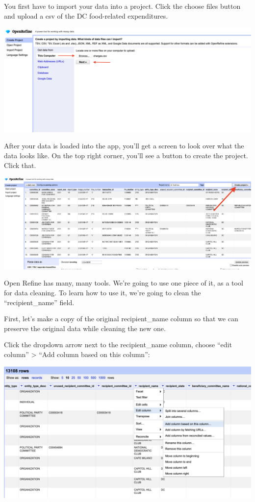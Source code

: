 \documentclass[
  letterpaper,
  DIV=11,
  numbers=noendperiod]{scrreprt}
\begin{document}
You first have to import your data into a project. Click the choose
files button and upload a csv of the DC food-related expenditures.

\includegraphics{./images/open1.png}

After your data is loaded into the app, you'll get a screen to look over
what the data looks like. On the top right corner, you'll see a button
to create the project. Click that.

\includegraphics{./images/open2.png}

Open Refine has many, many tools. We're going to use one piece of it, as
a tool for data cleaning. To learn how to use it, we're going to clean
the ``recipient\_name'' field.

First, let's make a copy of the original recipient\_name column so that
we can preserve the original data while cleaning the new one.

Click the dropdown arrow next to the recipient\_name column, choose
``edit column'' \textgreater{} ``Add column based on this column'':

\includegraphics{./images/open2a.png}
\end{document}
